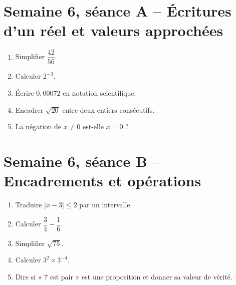 \section{Semaine 6, séance A -- Écritures d'un réel et valeurs approchées}
\begin{enumerate}
  \item Simplifier $\dfrac{42}{56}$.
  \item Calculer $2^{-3}$.
  \item Écrire $0{,}00072$ en notation scientifique.
  \item Encadrer $\sqrt{20}$ entre deux entiers consécutifs.
  \item La négation de $x\neq0$ est-elle $x=0$ ?
\end{enumerate}

\section{Semaine 6, séance B -- Encadrements et opérations}
\begin{enumerate}
  \item Traduire $|x-3|\leq2$ par un intervalle.
  \item Calculer $\dfrac34-\dfrac16$.
  \item Simplifier $\sqrt{75}$.
  \item Calculer $3^2\times3^{-4}$.
  \item Dire si « $7$ est pair » est une proposition et donner sa valeur de vérité.
\end{enumerate}

